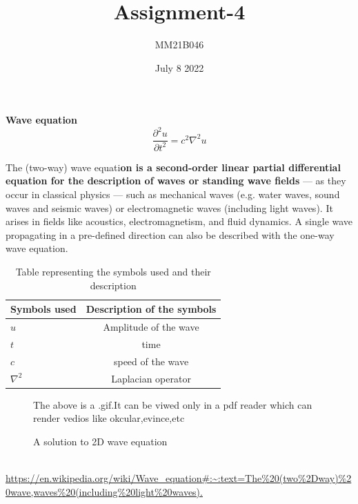 \documentclass[12pt]{article}
\title{Assignment-4}
\author{MM21B046 }
\date{July 8 2022}
\begin{document}
	\maketitle
	{\huge\textbf{Wave equation}}\\
	\vspace{1cm}
	{\huge$$\frac{\partial^2u}{\partial t^2} = c^2\nabla^2u$$}
	\vspace{2cm}

\setlength{\parindent}{80pt}The (two-way) wave equati\textbf{on is a second-order linear partial differential equation for the description of waves or standing wave fields} — as they occur in classical physics — such as mechanical waves (e.g. water waves, sound waves and seismic waves) or electromagnetic waves (including light waves). It arises in fields like acoustics, electromagnetism, and fluid dynamics. A single wave propagating in a pre-defined direction can also be described with the one-way wave equation.

\vspace{2cm}
\begin{table}[H]
	\centering
	\caption{Table representing the symbols used and their description}
	\vspace{0.4cm}
	\def\arraystretch{1.5}
	\setlength{\tabcolsep}{50pt}
	\begin{tabular}{|l||c|}
		\hline
		Symbols used  &  Description of the symbols \\ \hline \hline
		$u$ & Amplitude of the wave\\
		\hline
		$t$ & time\\
		\hline
		$c$ & speed of the wave\\
		\hline
		$\nabla^2$ & Laplacian operator\\
		\hline
\end{tabular}
\end{table}


\begin{figure}[H]
		\caption{A 2D water wave}
	\begin{center}
	 \end{center}
	\vspace{2cm}
		\caption{\large A solution to 2D wave equation }
	\begin{center}
	\end{center}{The above is a .gif.It can be viwed only in a pdf reader which can render vedios like okcular,evince,etc}
\end{figure}

\vspace{2cm}
\\[0.5cm]
\url{https://en.wikipedia.org/wiki/Wave_equation#:~:text=The%20(two%2Dway)%20wave,waves%20(including%20light%20waves).}
\end{document}
